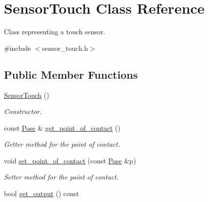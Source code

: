 \hypertarget{classSensorTouch}{}\section{Sensor\+Touch Class Reference}
\label{classSensorTouch}


Class representing a touch sensor.  




{\ttfamily \#include $<$sensor\+\_\+touch.\+h$>$}

\subsection*{Public Member Functions}
\begin{DoxyCompactItemize}
\item 
\hyperlink{classSensorTouch_ab8e0dc693ec2fbc1aa5ff25ee2bfdb19}{Sensor\+Touch} ()\hypertarget{classSensorTouch_ab8e0dc693ec2fbc1aa5ff25ee2bfdb19}{}\label{classSensorTouch_ab8e0dc693ec2fbc1aa5ff25ee2bfdb19}

\begin{DoxyCompactList}\small\item\em Constructor. \end{DoxyCompactList}\item 
const \hyperlink{structPose}{Pose} \& \hyperlink{classSensorTouch_a9f56fd943758125611863ce2bc0d9365}{get\+\_\+point\+\_\+of\+\_\+contact} ()
\begin{DoxyCompactList}\small\item\em Getter method for the point of contact. \end{DoxyCompactList}\item 
void \hyperlink{classSensorTouch_a2ef6d89a8e763e21f82e03a3033a490f}{set\+\_\+point\+\_\+of\+\_\+contact} (const \hyperlink{structPose}{Pose} \&p)
\begin{DoxyCompactList}\small\item\em Setter method for the point of contact. \end{DoxyCompactList}\item 
bool \hyperlink{classSensorTouch_a6a2f77ea46d008f4a058bfb24db742e0}{get\+\_\+output} () const \hypertarget{classSensorTouch_a6a2f77ea46d008f4a058bfb24db742e0}{}\label{classSensorTouch_a6a2f77ea46d008f4a058bfb24db742e0}


\end{DoxyCompactItemize}
